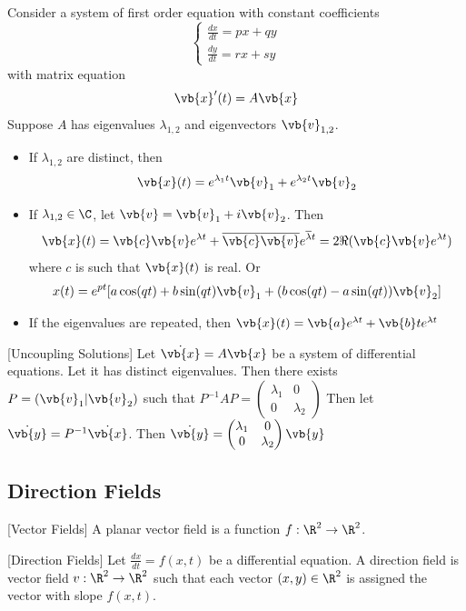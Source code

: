 \documentclass[a4paper]{article}
\begin{document}
\begin{thm}{}{} Consider a system of first order equation with constant coefficients $$\begin{cases}\frac{dx}{dt}=px+qy\\\frac{dy}{dt}=rx+sy\end{cases}$$ with matrix equation $$\vb{x}'(t)=A\vb{x}$$ Suppose $A$ has eigenvalues $\lambda_{1,2}$ and eigenvectors $\vb{v}_{1,2}$. 
\begin{itemize}
\item If $\lambda_{1,2}$ are distinct, then $$\vb{x}(t)=e^{\lambda_1t}\vb{v}_1+e^{\lambda_2t}\vb{v}_2$$
\item If $\lambda_{1,2}\in\C$, let $\vb{v}=\vb{v}_1+i\vb{v}_2$. Then $$\vb{x}(t)=\vb{c}\vb{v}e^{\lambda t}+\overline{\vb{c}}\overline{\vb{v}}e^{\overline{\lambda}t}=2\Re(\vb{c}\vb{v}e^{\lambda t})$$ where $c$ is such that $\vb{x}(t)$ is real. Or $$x(t)=e^{pt}[a\cos(qt)+b\sin(qt)\vb{v}_1+(b\cos(qt)-a\sin(qt))\vb{v}_2]$$
\item If the eigenvalues are repeated, then $\vb{x}(t)=\vb{a}e^{\lambda t}+\vb{b}te^{\lambda t}$
\end{itemize}
\end{thm}

\begin{thm}{}{}[Uncoupling Solutions] Let $\dot{\vb{x}}=A\vb{x}$ be a system of differential equations. Let it has distinct eigenvalues. Then there exists $P=(\vb{v}_1|\vb{v}_2)$ such that $P^{-1}AP=\begin{pmatrix}
\lambda_1 & 0\\
0 & \lambda_2
\end{pmatrix}$ Then let $\dot{\vb{y}}=P^{-1}\dot{\vb{x}}$. Then $\dot{\vb{y}}=\begin{pmatrix}
\lambda_1 & 0\\
0 & \lambda_2
\end{pmatrix}\vb{y}$
\end{thm}

\subsection{Direction Fields}
\begin{defn}{}{}[Vector Fields] A planar vector field is a function $f:\R^2\to\R^2$. 
\end{defn}

\begin{defn}{}{}[Direction Fields] Let $\frac{dx}{dt}=f(x,t)$ be a differential equation. A direction field is vector field $v:\R^2\to\R^2$ such that each vector $(x,y)\in\R^2$ is assigned the vector with slope $f(x,t)$. 
\end{defn}
\end{document}
